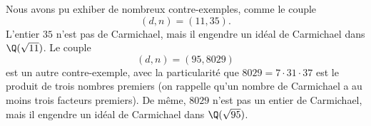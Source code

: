 \documentclass[a4paper, 12pt, oneside]{article}
\begin{document}
\vspace{1em}
\begin{algorithm}[H]
\end{algorithm}
\vspace{1em}

Nous avons pu exhiber de nombreux contre-exemples, comme le couple $$(d, n) = (11, 35).$$ L'entier $35$ n'est pas de Carmichael, mais il engendre un idéal de Carmichael dans $\Q(\sqrt{11})$. Le couple $$(d, n) = (95,8029)$$ est un autre contre-exemple, avec la particularité que $8029 = 7\cdot 31\cdot 37$ est le produit de trois nombres premiers (on rappelle qu'un nombre de Carmichael a au moins trois facteurs premiers). De même, $8029$ n'est pas un entier de Carmichael, mais il engendre un idéal de Carmichael dans $\Q(\sqrt{95})$.

\nocite{*}
\printbibliography
\end{document}
